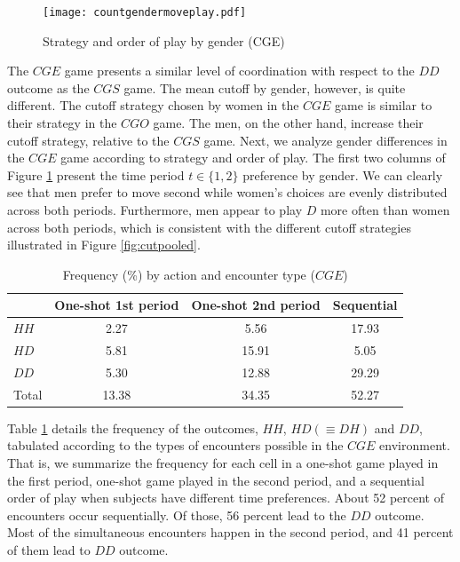 \documentclass[12pt,english]{article}
\begin{document}
\begin{center}
\begin{figure}[ht]
\centering{}%
\texttt{[image: countgendermoveplay.pdf]}%
\caption{Strategy and order of play by gender (CGE)} 
\label{fig:cgepooled}
\end{figure}
\end{center}

The $CGE$ game presents a similar level of coordination with respect to the $DD$ outcome as the $CGS$ game. The mean cutoff by gender, however, is quite different. The cutoff strategy chosen by women in the $CGE$ game is similar to their strategy in the $CGO$ game. The men, on the other hand, increase their cutoff strategy, relative to the $CGS$ game. Next, we analyze gender differences in the $CGE$ game according to strategy and order of play. The first two columns of Figure \ref{fig:cgepooled} present the time period $t\in\{1,2\}$ preference by gender. We can clearly see that men prefer to move second while women's choices are evenly distributed across both periods. Furthermore, men appear to play $D$ more often than women across both periods, which is consistent with the different cutoff strategies illustrated in Figure \ref{fig:cutpooled}.

\begin{table}[!t]
\centering\caption{Frequency (\%) by action and encounter type ($CGE$)}

\begin{tabular}{lccc}
\hline
 & One-shot 1st period & One-shot 2nd period  & Sequential\\
  \hline
  $HH$ &  2.27 & 5.56 & 17.93 \\
  $HD$ & 5.81 & 15.91 & 5.05 \\
  $DD$& 5.30 & 12.88 & 29.29 \\
  \hline
Total & 13.38 & 34.35 & 52.27\\
\end{tabular}

\label{tab(CGE)}
\end{table}

Table \ref{tab(CGE)} details the frequency of the outcomes, $HH$, $HD(\equiv DH)$ and $DD$, tabulated according to the types of encounters possible in the $CGE$ environment. That is, we summarize the frequency for each cell in a one-shot game played in the first period, one-shot game played in the second period, and a sequential order of play when subjects have different time preferences. About 52 percent of encounters occur sequentially. Of those, 56 percent lead to the $DD$ outcome. Most of the simultaneous encounters happen in the second period, and 41 percent of them lead to $DD$ outcome.  \\
\end{document}
